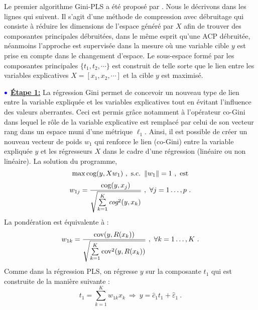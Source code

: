 Le premier algorithme Gini-PLS a été proposé par \citet{mussard2018ginipls}. Nous le décrivons dans les lignes qui suivent. Il s'agit d'une méthode de compression avec débruitage qui consiste à réduire les dimensions de l'espace généré par $X$ afin de trouver des composantes principales débruitées, dans le même esprit qu'une ACP débruitée, néanmoins l'approche est supervisée dans la mesure où une variable cible $y$ est prise en compte dans le changement d'espace. Le sous-espace formé par les composantes principales $\{t_1,t_2,\cdots\}$ est construit de telle sorte que le lien entre les variables explicatives $X = [x_1,x_2,\cdots]$ et la cible $y$ est maximisé. 

\medskip

$\bulle$ \underline{\textbf{Étape 1:}} La régression Gini permet de concevoir un nouveau type de lien entre la variable expliquée et les variables explicatives tout en évitant l'influence des valeurs aberrantes. Ceci est permis grâce notamment à l'opérateur co-Gini dans lequel le rôle de la variable explicative est remplacé par celui de son vecteur rang dans un espace muni d'une métrique $\ell_1$. Ainsi, il est possible de créer un nouveau vecteur de poids $w_1$ qui renforce le lien (co-Gini) entre la variable expliquée $y$ et les régresseurs $X$ dans le cadre d'une régression (linéaire ou non linéaire).
\newline La solution du programme,
\[
\max \cog(y,X w_1) \ , \ \text{s.c.} \ \left\|w_1\right\|=1 \ , \ \text{est}
\]
\begin{equation}\notag
w_{1j} = \frac{\text{cog}(y,x_j)}{\sqrt{\sum\limits_{k=1}^K \emph{cog}^2(y,x_k)}} \ , \ \forall j = 1\ldots,p \ .
\end{equation}
La pondération est équivalente à :
\begin{equation}\notag
w_{1k} = \frac{\text{cov}(y,R(x_k))}{\sqrt{\sum\limits_{k=1}^K \text{cov}^2(y,R(x_k))}} \ , \ \forall k = 1\ldots,K \ .
\end{equation}
Comme dans la régression PLS, on régresse $y$ sur la composante $t_1$ qui est construite de la manière suivante :
\[
t_1 = \sum_{k=1}^K w_{1k}x_k \ \Longrightarrow \ y = \hat{c}_1 t_1 + \hat{\varepsilon}_1 \ .
\]

\medskip

